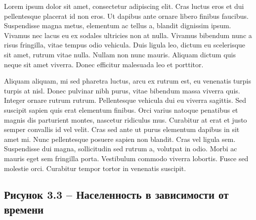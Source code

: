 \documentclass{article}
\begin{document}
 Lorem ipsum dolor sit amet, consectetur adipiscing elit. Cras luctus eros et dui pellentesque placerat id non eros. Ut dapibus ante ornare libero finibus faucibus. Suspendisse magna metus, elementum ac tellus a, blandit dignissim ipsum. Vivamus nec lacus eu ex sodales ultricies non at nulla. Vivamus bibendum nunc a risus fringilla, vitae tempus odio vehicula. Duis ligula leo, dictum eu scelerisque sit amet, rutrum vitae nulla. Nullam non nunc mauris. Aliquam dictum quis neque sit amet viverra. Donec efficitur malesuada leo et porttitor.

Aliquam aliquam, mi sed pharetra luctus, arcu ex rutrum est, eu venenatis turpis turpis at nisl. Donec pulvinar nibh purus, vitae bibendum massa viverra quis. Integer ornare rutrum rutrum. Pellentesque vehicula dui eu viverra sagittis. Sed suscipit sapien quis erat elementum finibus. Orci varius natoque penatibus et magnis dis parturient montes, nascetur ridiculus mus. Curabitur at erat et justo semper convallis id vel velit. Cras sed ante ut purus elementum dapibus in sit amet mi. Nunc pellentesque posuere sapien non blandit. Cras vel ligula sem. Suspendisse dui magna, sollicitudin sed rutrum a, volutpat in odio. Morbi ac mauris eget sem fringilla porta. Vestibulum commodo viverra lobortis. Fusce sed molestie orci. Curabitur tempor tortor in venenatis suscipit. 


\subsection{Рисунок 3.3 – Населенность в зависимости от времени}

\end{document}
